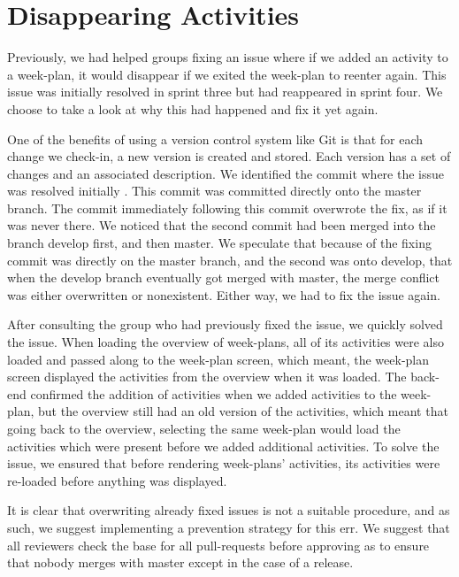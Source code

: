 \section{Disappearing Activities}

Previously, we had helped groups fixing an issue where if we added an activity to a week-plan, it would disappear if we exited the week-plan to reenter again. This issue was initially resolved in sprint three but had reappeared in sprint four. We choose to take a look at why this had happened and fix it yet again.

One of the benefits of using a version control system like Git is that for each change we check-in, a new version is created and stored. Each version has a set of changes and an associated description. We identified the commit where the issue was resolved initially \cite{weekplan_issue_257_fix}. This commit was committed directly onto the master branch. The commit immediately following this commit \cite{weekplan_issue_257_fix-2}  overwrote the fix, as if it was never there. We noticed that the second commit had been merged into the branch develop first, and then master. We speculate that because of the fixing commit was directly on the master branch, and the second was onto develop, that when the develop branch eventually got merged with master, the merge conflict was either overwritten or nonexistent. Either way, we had to fix the issue again. 

After consulting the group who had previously fixed the issue, we quickly solved the issue. When loading the overview of week-plans, all of its activities were also loaded and passed along to the week-plan screen, which meant, the week-plan screen displayed the activities from the overview when it was loaded. The back-end confirmed the addition of activities when we added activities to the week-plan, but the overview still had an old version of the activities, which meant that going back to the overview, selecting the same week-plan would load the activities which were present before we added additional activities. To solve the issue, we ensured that before rendering week-plans' activities, its activities were re-loaded before anything was displayed.

It is clear that overwriting already fixed issues is not a suitable procedure, and as such, we suggest implementing a prevention strategy for this err. We suggest that all reviewers check the base for all pull-requests before approving as to ensure that nobody merges with master except in the case of a release.
